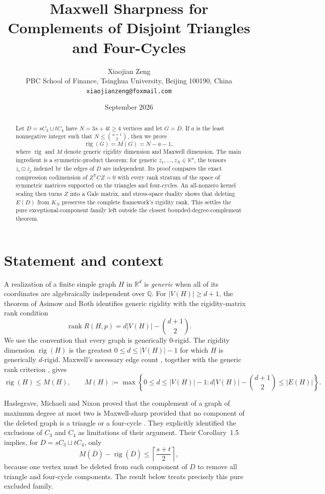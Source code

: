 \documentclass[11pt]{article}
\title{Maxwell Sharpness for Complements of Disjoint Triangles and Four-Cycles}
\author{Xiaojian Zeng\\
  PBC School of Finance, Tsinghua University, Beijing 100190, China\\
  \texttt{xiaojianzeng@foxmail.com}}
\date{September 2026}
\newcommand{\R}{\mathbb{R}}
\newcommand{\K}{\mathbb{K}}
\newcommand{\rig}{\operatorname{rig}}
\newcommand{\rank}{\operatorname{rank}}
\begin{document}
\maketitle

\begin{abstract}
Let $D=sC_3\sqcup tC_4$ have $N=3s+4t\geq4$ vertices and let
$G=\overline D$.  If $a$ is the least nonnegative integer such that
$N\leq\binom{a+1}{2}$, then we prove
\[
 \rig(G)=M(G)=N-a-1,
\]
where $\rig$ and $M$ denote generic rigidity dimension and Maxwell
dimension.  The main ingredient is a symmetric-product theorem: for generic
$z_1,\ldots,z_N\in\K^a$, the tensors $z_i\odot z_j$ indexed by the edges of
$D$ are independent.  Its proof compares the exact compression codimension
of $Z^{\mathsf T}CZ=0$ with every rank stratum of the space of symmetric
matrices supported on the triangles and four-cycles.  An all-nonzero kernel
scaling then turns $Z$ into a Gale matrix, and stress-space duality shows that
deleting $E(D)$ from $K_N$ preserves the complete framework's rigidity rank.
This settles the pure exceptional-component family left outside the closest
bounded-degree-complement theorem.
\end{abstract}

\section{Statement and context}

A realization of a finite simple graph $H$ in $\R^d$ is \emph{generic} when
all of its coordinates are algebraically independent over $\mathbb Q$.
For $|V(H)|\geq d+1$, the theorem of Asimow and Roth identifies generic
rigidity with the rigidity-matrix rank condition
\[
 \rank R(H,p)=d|V(H)|-\binom{d+1}{2}.
 \tag{1.1}
\]
We use the convention that every graph is generically $0$-rigid.  The
rigidity dimension $\rig(H)$ is the greatest $0\leq d\leq |V(H)|-1$ for
which $H$ is generically $d$-rigid.  Maxwell's necessary edge count
\cite{Maxwell1864}, together with the generic rank criterion
\cite{AsimowRoth1978}, gives
\[
 \rig(H)\leq M(H),\qquad
 M(H):=\max\left\{0\leq d\leq |V(H)|-1:
 d|V(H)|-\binom{d+1}{2}\leq |E(H)|\right\}.
 \tag{1.2}
\]

Haslegrave, Michaeli and Nixon proved that the complement of a graph of
maximum degree at most two is Maxwell-sharp provided that no component of the
deleted graph is a triangle or a four-cycle
\cite[Theorem~1.4]{HaslegraveMichaeliNixon2026}.  They explicitly identified
the exclusions of $C_3$ and $C_4$ as limitations of their argument.  Their
Corollary~1.5 implies, for $D=sC_3\sqcup tC_4$, only
\[
 M(\overline D)-\rig(\overline D)
 \leq \left\lceil\frac{s+t}{2}\right\rceil,
 \tag{1.3}
\]
because one vertex must be deleted from each component of $D$ to remove all
triangle and four-cycle components.  The result below treats precisely this
pure excluded family.
\end{document}
